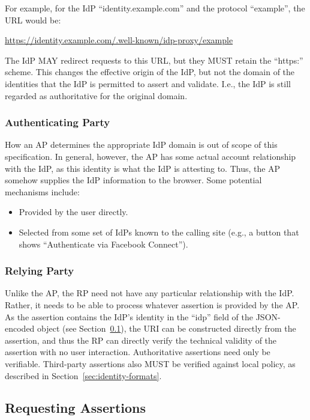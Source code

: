 \documentclass{article}
\begin{document}
For example, for the IdP ``identity.example.com'' and the protocol
``example'', the URL would be:

\url{https://identity.example.com/.well-known/idp-proxy/example}

The IdP MAY redirect requests to this URL, but they MUST retain the
``https:'' scheme.  This changes the effective origin of the IdP, but
not the domain of the identities that the IdP is permitted to assert
and validate.  I.e., the IdP is still regarded as authoritative for
the original domain.

\subsubsection{Authenticating Party}

How an AP determines the appropriate IdP domain is out of scope of
this specification.  In general, however, the AP has some actual
account relationship with the IdP, as this identity is what the IdP
is attesting to.  Thus, the AP somehow supplies the IdP information
to the browser.  Some potential mechanisms include:

\begin{itemize}
\item Provided by the user directly.

\item Selected from some set of IdPs known to the calling site (e.g., a
  button that shows ``Authenticate via Facebook Connect'').
\end{itemize}

\subsubsection{Relying Party}

Unlike the AP, the RP need not have any particular relationship with
the IdP.  Rather, it needs to be able to process whatever assertion
is provided by the AP.  As the assertion contains the IdP's identity
in the ``idp'' field of the JSON-encoded object (see Section~\ref{sec:requesting-assertions}), the
URI can be constructed directly from the assertion, and thus the RP
can directly verify the technical validity of the assertion with no
user interaction.  Authoritative assertions need only be verifiable.
Third-party assertions also MUST be verified against local policy, as
described in Section~\ref{sec:identity-formats}.

\subsection{Requesting Assertions}
\label{sec:requesting-assertions}
\end{document}
